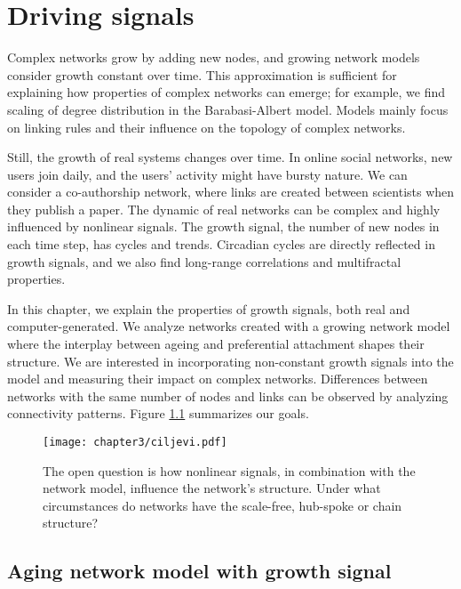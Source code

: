 
\chapter{Driving signals} %
\label{Ch:signals} %

Complex networks grow by adding new nodes, and growing network models consider growth constant over time. This approximation is sufficient for explaining how properties of complex networks can emerge; for example, we find scaling of degree distribution in the Barabasi-Albert model. Models mainly focus on linking rules and their influence on the topology of complex networks. 

Still, the growth of real systems changes over time. In online social networks, new users join daily, and the users' activity might have bursty nature. We can consider a co-authorship network, where links are created between scientists when they publish a paper. The dynamic of real networks can be complex and highly influenced by nonlinear signals. The growth signal, the number of new nodes in each time step, has cycles and trends. Circadian cycles are directly reflected in growth signals, and we also find long-range correlations and multifractal properties. 

In this chapter, we explain the properties of growth signals, both real and computer-generated. We analyze networks created with a growing network model where the interplay between ageing and preferential attachment shapes their structure. We are interested in incorporating non-constant growth signals into the model and measuring their impact on complex networks. Differences between networks with the same number of nodes and links can be observed by analyzing connectivity patterns. Figure \ref{fig:ciljevi} summarizes our goals. 

\begin{figure}[!ht]
	\centering
	\texttt{[image: chapter3/ciljevi.pdf]}
	\caption[Nonlinear growth of the network.]{The open question is how nonlinear signals, in combination with the network model, influence the network's structure. Under what circumstances do networks have the scale-free, hub-spoke or chain structure? }
	\label{fig:ciljevi}
\end{figure}

\section{Aging network model with growth signal}

